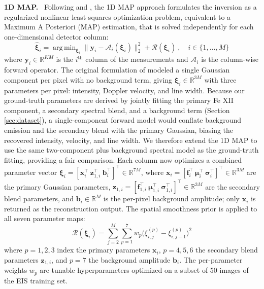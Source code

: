 \documentclass[linenumbers,twocolumn]{aastex7}
\DeclareMathOperator*{\argmin}{arg\,min}
\begin{document}
\noindent
\textbf{1D MAP.} \ Following \citet{davila2019slitless} and
\citet{oktem2014parametric}, the 1D MAP approach formulates the inversion as a
regularized nonlinear least-squares optimization problem, equivalent to a
Maximum A Posteriori (MAP) estimation, that is solved independently for each
one-dimensional detector column:
\begin{equation}
\hat {\bm \xi}_i = \argmin_{\bm \xi_i} \|\bm y_i - \bm{\mathcal A}_i (\bm \xi_i) \|_2^2
+ \mathcal R (\bm \xi_i) \ , \quad i \in \{1,\dots,M\}
\label{eq:1dmap}
\end{equation}
where $\bm y_i \in \mathbb R^{KM}$ is the $i^{\text{th}}$ column of the
measurements and $\bm{\mathcal A}_i$ is the column-wise forward operator. The
original formulation of \citet{davila2019slitless} modeled a single Gaussian
component per pixel with no background term, giving $\bm \xi_i \in \mathbb
R^{3M}$ with three parameters per pixel: intensity, Doppler velocity, and line
width. Because our ground-truth parameters are derived by jointly
fitting the primary Fe XII component, a secondary spectral blend, and a
background term (Section \ref{sec:dataset}), a single-component forward model
would conflate background emission and the secondary blend with the primary
Gaussian, biasing the recovered intensity, velocity, and line width. We
therefore extend the 1D MAP to use the same two-component plus background
spectral model as the ground-truth fitting, providing a fair comparison. Each
column now optimizes a combined parameter vector
$\bm \xi_i = [\bm x_i^\top \ \bm z_{1,i}^\top \ \bm b_i^\top]^\top \in
\mathbb R^{7M}$, where $\bm x_i = [\bm f_i^\top \ \bm \mu_i^\top \ \bm
\sigma_i^\top]^\top \in \mathbb R^{3M}$ are the primary Gaussian parameters,
$\bm z_{1,i} = [\bm f_{1,i}^\top \ \bm \mu_{1,i}^\top \ \bm
\sigma_{1,i}^\top]^\top \in \mathbb R^{3M}$ are the secondary blend parameters,
and $\bm b_i \in \mathbb R^M$ is the per-pixel background amplitude; only $\bm
x_i$ is returned as the reconstruction output. The spatial smoothness prior is
applied to all seven parameter maps:
\begin{equation}
\mathcal R(\bm \xi_i) = \sum_{j=2}^{M} \sum_{p=1}^{7} w_p
\bigl(\xi_{i,j}^{(p)} - \xi_{i,j-1}^{(p)}\bigr)^2
\label{eq:1dmap_reg}
\end{equation}
where $p=1,2,3$ index the primary parameters $\bm x_i$, $p=4,5,6$ the
secondary blend parameters $\bm z_{1,i}$, and $p=7$ the background amplitude
$\bm b_i$. The per-parameter weights $w_p$ are tunable hyperparameters
optimized on a subset of 50 images of the EIS training set.
\end{document}
